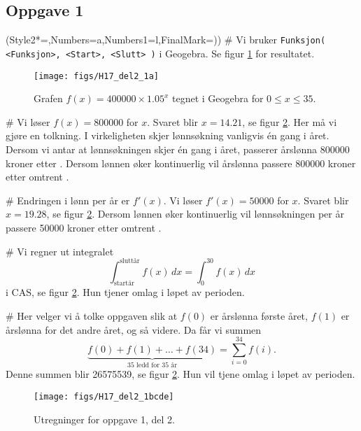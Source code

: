 \subsection*{Oppgave 1}
\begin{easylist}[enumerate]
\ListProperties(Style2*=,Numbers=a,Numbers1=l,FinalMark={)})
# Vi bruker \verb|Funksjon( <Funksjon>, <Start>, <Slutt> )| i Geogebra.
Se figur \ref{fig:H17_del2_1a} for resultatet.
\begin{figure}[ht!]
	\centering
	\texttt{[image: figs/H17\_del2\_1a]}
	\caption{Grafen $f(x) = 400000 \times 1.05^x$ tegnet i Geogebra for $0 \leq x \leq 35$.}
	\label{fig:H17_del2_1a}
\end{figure}
# Vi løser $f(x) = 800000$ for $x$.
Svaret blir $x = 14.21$, se figur \ref{fig:H17_del2_1bcde}.
Her må vi gjøre en tolkning.
I virkeligheten skjer lønnsøkning vanligvis én gang i året.
Dersom vi antar at lønnsøkningen skjer én gang i året, passerer årslønna 800000 kroner etter .
Dersom lønnen øker kontinuerlig vil årslønna passere 800000 kroner etter omtrent .

# Endringen i lønn per år er $f'(x)$.
Vi løser $f'(x) = 50000$ for $x$.
Svaret blir $x = 19.28$, se figur \ref{fig:H17_del2_1bcde}.
Dersom lønnen øker kontinuerlig vil lønnsøkningen per år passere 50000 kroner etter omtrent .

# Vi regner ut integralet
\begin{equation*}
	\int_{\text{startår}}^{\text{sluttår}} f(x) \, dx = \int_{0}^{30} f(x) \, dx
\end{equation*}
i CAS, se figur \ref{fig:H17_del2_1bcde}.
Hun tjener omlag  i løpet av perioden.

# Her velger vi å tolke oppgaven slik at $f(0)$ er årslønna første året, $f(1)$ er årslønna for det andre året, og så videre.
Da får vi summen
\begin{equation*}
	\underset{\text{35 ledd for 35 år}}{\underbrace{f(0) + f(1) + \dots + f(34)}} =
	 \sum_{i = 0}^{34} f(i) .
\end{equation*}
Denne summen blir 26575539, se figur \ref{fig:H17_del2_1bcde}.
Hun vil tjene omlag  i løpet av perioden.
\end{easylist}

\begin{figure}[ht!]
\centering
\texttt{[image: figs/H17\_del2\_1bcde]}
\caption{Utregninger for oppgave 1, del 2.}
\label{fig:H17_del2_1bcde}
\end{figure}

